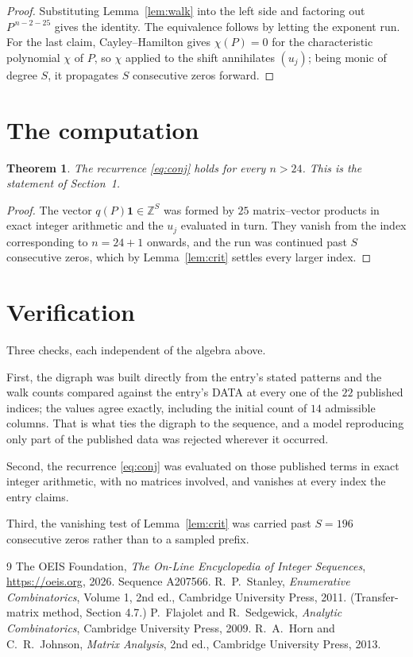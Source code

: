 \documentclass[11pt,a4paper]{article}
\theoremstyle{plain}
\newtheorem{theorem}{Theorem}
\theoremstyle{definition}
\begin{document}
\begin{proof}
Substituting Lemma~\ref{lem:walk} into the left side and factoring out
$P^{\,n-2-25}$ gives the identity. The equivalence follows by letting the exponent
run. For the last claim, Cayley--Hamilton gives $\chi(P)=0$ for the characteristic
polynomial $\chi$ of $P$, so $\chi$ applied to the shift annihilates $(u_j)$; being monic of
degree $S$, it propagates $S$ consecutive zeros forward.
\end{proof}

\section{The computation}

\begin{theorem}
The recurrence \eqref{eq:conj} holds for every $n>24$. This is the statement of
Section~1.
\end{theorem}

\begin{proof}
The vector $q(P)\mathbf{1}\in\mathbb{Z}^{S}$ was formed by $25$ matrix--vector
products in exact integer arithmetic and the $u_j$ evaluated in turn. They vanish from the
index corresponding to $n=24+1$ onwards, and the run was continued past $S$ consecutive
zeros, which by Lemma~\ref{lem:crit} settles every larger index.
\end{proof}

\section{Verification}

Three checks, each independent of the algebra above.

First, the digraph was built directly from the entry's stated patterns and the walk counts
compared against the entry's DATA at every one of the $22$ published indices; the
values agree exactly, including the initial count of $14$ admissible columns. That is
what ties the digraph to the sequence, and a model reproducing only part of the published
data was rejected wherever it occurred.

Second, the recurrence \eqref{eq:conj} was evaluated on those published terms in exact
integer arithmetic, with no matrices involved, and vanishes at every index the entry claims.

Third, the vanishing test of Lemma~\ref{lem:crit} was carried past $S=196$ consecutive
zeros rather than to a sampled prefix.

\begin{thebibliography}{9}
 The OEIS Foundation, \emph{The On-Line Encyclopedia of Integer
Sequences}, \url{https://oeis.org}, 2026. Sequence A207566.
 R.~P.~Stanley, \emph{Enumerative Combinatorics}, Volume 1, 2nd ed.,
Cambridge University Press, 2011. (Transfer-matrix method, Section 4.7.)
 P.~Flajolet and R.~Sedgewick, \emph{Analytic Combinatorics}, Cambridge
University Press, 2009.
 R.~A.~Horn and C.~R.~Johnson, \emph{Matrix Analysis}, 2nd ed., Cambridge
University Press, 2013.
\end{thebibliography}
\end{document}
